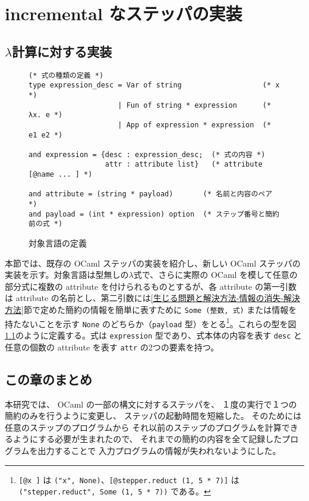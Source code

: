 \chapter{incremental なステッパの実装}
\label{chapter:incremental}







\section{$\lambda$計算に対する実装}

\begin{figure}
\begin{verbatim}
(* 式の種類の定義 *)
type expression_desc = Var of string                   (* x *)
                     | Fun of string * expression      (* λx. e *)
                     | App of expression * expression  (* e1 e2 *)
                              
and expression = {desc : expression_desc;  (* 式の内容 *)
                  attr : attribute list}   (* attribute [@name ... ] *)

and attribute = (string * payload)       (* 名前と内容のペア *)
and payload = (int * expression) option  (* ステップ番号と簡約前の式 *)
\end{verbatim}
\caption{対象言語の定義}
\label{figure:lambda}
\end{figure}

本節では、既存の OCaml ステッパ\cite{FCA19}の実装を紹介し、新しい OCaml ステッパの実装を示す。対象言語は型無しの$\lambda$式で、さらに実際の OCaml を模して任意の部分式に複数の attribute を付けられるものとするが、各 attribute の第一引数は attribute の名前とし、第二引数には\ref{生じる問題と解決方法-情報の消失-解決方法}節で定めた簡約の情報を簡単に表すために \texttt{Some (整数, 式)} または情報を持たないことを示す \texttt{None} のどちらか（\texttt{payload} 型）をとる\footnote{\texttt{[@x ]} は \texttt{("x", None)}、\texttt{[@stepper.reduct (1, 5 * 7)]} は \texttt{("stepper.reduct", Some (1, 5 * 7))} である。}。これらの型を図\ref{figure:lambda}のように定義する。式は \texttt{expression} 型であり、式本体の内容を表す \texttt{desc} と任意の個数の attribute を表す \texttt{attr} の2つの要素を持つ。











\section{この章のまとめ}

本研究では、
OCaml の一部の構文に対するステッパを、
１度の実行で１つの簡約のみを行うように変更し、
ステッパの起動時間を短縮した。
そのためには任意のステップのプログラムから
それ以前のステップのプログラムを計算できるようにする必要が生まれたので、
それまでの簡約の内容を全て記録したプログラムを出力することで
入力プログラムの情報が失われないようにした。
